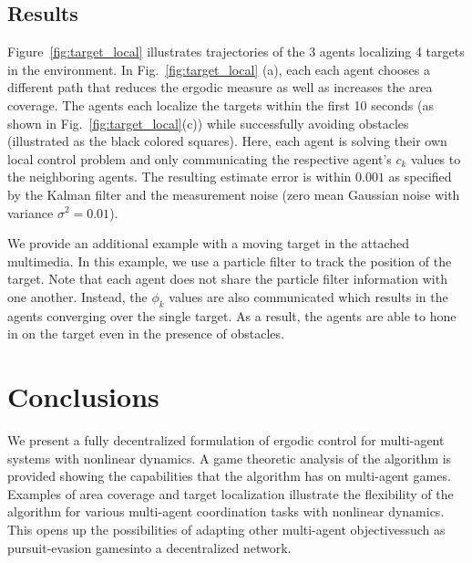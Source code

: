 \documentclass[letterpaper, 10 pt, conference]{ieeeconf}  %
\begin{document}
\subsection{Results}
Figure~\ref{fig:target_local} illustrates trajectories of the 3 agents localizing 4 targets in the environment. 
In Fig.~\ref{fig:target_local} (a), each each agent chooses a different path that reduces the ergodic measure as well as increases the area coverage.
The agents each localize the targets within the first 10 seconds (as shown in Fig.~\ref{fig:target_local}(c)) while successfully avoiding obstacles (illustrated as the black colored squares).
Here, each agent is solving their own local control problem and only communicating the respective agent's $c_k$ values to the neighboring agents.
The resulting estimate error is within $0.001$ as specified by the Kalman filter and the measurement noise (zero mean Gaussian noise with variance $\sigma^2 = 0.01$).


We provide an additional example with a moving target in the attached multimedia.
In this example, we use a particle filter to track the position of the target.
Note that each agent does not share the particle filter information with one another.
Instead, the $\phi_k$ values are also communicated which results in the agents converging over the single target.
As a result, the agents are able to hone in on the target even in the presence of obstacles.

\section{Conclusions}
\label{sec:conclusions}
We present a fully decentralized formulation of ergodic control for multi-agent systems with nonlinear dynamics.
A game theoretic analysis of the algorithm is provided showing the capabilities that the algorithm has on multi-agent games.
Examples of area coverage and target localization illustrate the flexibility of the algorithm for various multi-agent coordination tasks with nonlinear dynamics.
This opens up the possibilities of adapting other multi-agent objectives\textemdash such as pursuit-evasion games\textemdash into a decentralized network.
\end{document}

